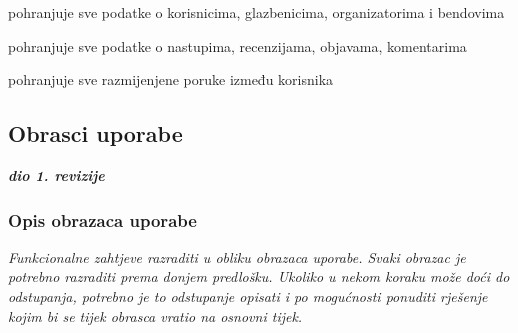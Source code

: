 \begin{packed_enum}
\begin{packed_enum}
\end{packed_enum}

\item  {}

\begin{packed_enum}
	
	\item pohranjuje sve podatke o korisnicima, glazbenicima, organizatorima i bendovima
	\item pohranjuje sve podatke o nastupima, recenzijama, objavama, komentarima
	\item pohranjuje sve razmijenjene poruke između korisnika 
	
\end{packed_enum}
		
\end{packed_enum}
			
\eject 
			
			
				
			\subsection{Obrasci uporabe}
				
				\textbf{\textit{dio 1. revizije}}
				
				\subsubsection{Opis obrazaca uporabe}
					\textit{Funkcionalne zahtjeve razraditi u obliku obrazaca uporabe. Svaki obrazac je potrebno razraditi prema donjem predlošku. Ukoliko u nekom koraku može doći do odstupanja, potrebno je to odstupanje opisati i po mogućnosti ponuditi rješenje kojim bi se tijek obrasca vratio na osnovni tijek.}\\
					

